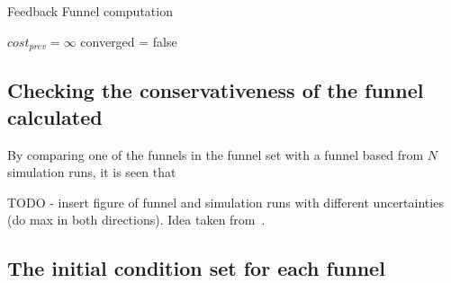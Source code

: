 \begin{algorithm}[H]
  \caption{Feedback Funnel computation}
  \label{alg:funnelalgorithm-extended}
  \DontPrintSemicolon \SetAlgoNoLine

   

  \(cost_{prev} = \infty\)\; converged = false \; \;
\end{algorithm}

\subsection{Checking the conservativeness of the funnel calculated}

By comparing one of the funnels in the funnel set with a funnel based from \(N\)
simulation runs, it is seen that

TODO - insert figure of funnel and simulation runs with different uncertainties
(do max in both directions).
Idea taken from~\cite{mooreControlSynthesisVerification2012}.

\subsection{The initial condition set for each funnel}


